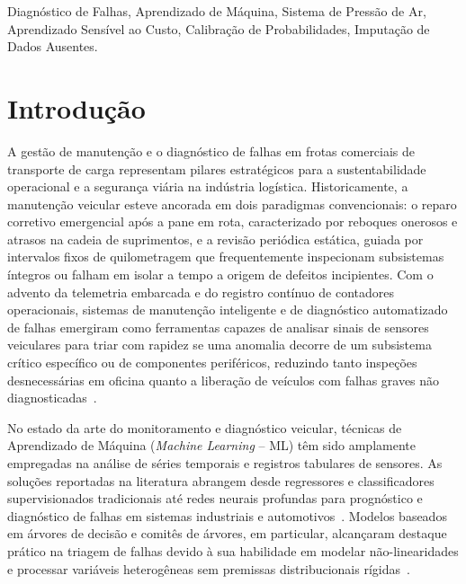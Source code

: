 \documentclass[conference]{IEEEtran}
\begin{document}
\begin{IEEEkeywords}
Diagnóstico de Falhas, Aprendizado de Máquina, Sistema de Pressão de Ar, Aprendizado Sensível ao Custo, Calibração de Probabilidades, Imputação de Dados Ausentes.
\end{IEEEkeywords}

\section{Introdução}

A gestão de manutenção e o diagnóstico de falhas em frotas comerciais de transporte de carga representam pilares estratégicos para a sustentabilidade operacional e a segurança viária na indústria logística. Historicamente, a manutenção veicular esteve ancorada em dois paradigmas convencionais: o reparo corretivo emergencial após a pane em rota, caracterizado por reboques onerosos e atrasos na cadeia de suprimentos, e a revisão periódica estática, guiada por intervalos fixos de quilometragem que frequentemente inspecionam subsistemas íntegros ou falham em isolar a tempo a origem de defeitos incipientes. Com o advento da telemetria embarcada e do registro contínuo de contadores operacionais, sistemas de manutenção inteligente e de diagnóstico automatizado de falhas emergiram como ferramentas capazes de analisar sinais de sensores veiculares para triar com rapidez se uma anomalia decorre de um subsistema crítico específico ou de componentes periféricos, reduzindo tanto inspeções desnecessárias em oficina quanto a liberação de veículos com falhas graves não diagnosticadas~\cite{hector2024predictive}.

No estado da arte do monitoramento e diagnóstico veicular, técnicas de Aprendizado de Máquina (\textit{Machine Learning} -- ML) têm sido amplamente empregadas na análise de séries temporais e registros tabulares de sensores. As soluções reportadas na literatura abrangem desde regressores e classificadores supervisionados tradicionais até redes neurais profundas para prognóstico e diagnóstico de falhas em sistemas industriais e automotivos~\cite{rengasamy2020deep}. Modelos baseados em árvores de decisão e comitês de árvores, em particular, alcançaram destaque prático na triagem de falhas devido à sua habilidade em modelar não-linearidades e processar variáveis heterogêneas sem premissas distribucionais rígidas~\cite{gondek2016prediction,cerqueira2016combining}.
\end{document}
